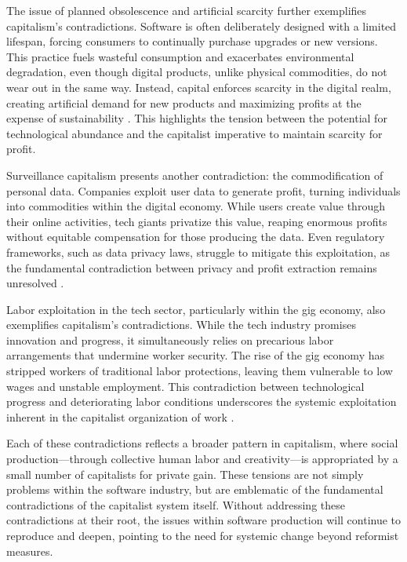 \begin{refsection}
The issue of planned obsolescence and artificial scarcity further exemplifies capitalism’s contradictions. Software is often deliberately designed with a limited lifespan, forcing consumers to continually purchase upgrades or new versions. This practice fuels wasteful consumption and exacerbates environmental degradation, even though digital products, unlike physical commodities, do not wear out in the same way. Instead, capital enforces scarcity in the digital realm, creating artificial demand for new products and maximizing profits at the expense of sustainability \cite[pp.~151-154]{foster2019}. This highlights the tension between the potential for technological abundance and the capitalist imperative to maintain scarcity for profit.

Surveillance capitalism presents another contradiction: the commodification of personal data. Companies exploit user data to generate profit, turning individuals into commodities within the digital economy. While users create value through their online activities, tech giants privatize this value, reaping enormous profits without equitable compensation for those producing the data. Even regulatory frameworks, such as data privacy laws, struggle to mitigate this exploitation, as the fundamental contradiction between privacy and profit extraction remains unresolved \cite[pp.~111-113]{zuboff2020}.

Labor exploitation in the tech sector, particularly within the gig economy, also exemplifies capitalism’s contradictions. While the tech industry promises innovation and progress, it simultaneously relies on precarious labor arrangements that undermine worker security. The rise of the gig economy has stripped workers of traditional labor protections, leaving them vulnerable to low wages and unstable employment. This contradiction between technological progress and deteriorating labor conditions underscores the systemic exploitation inherent in the capitalist organization of work \cite[pp.~145-148]{scholz2017}.

Each of these contradictions reflects a broader pattern in capitalism, where social production—through collective human labor and creativity—is appropriated by a small number of capitalists for private gain. These tensions are not simply problems within the software industry, but are emblematic of the fundamental contradictions of the capitalist system itself. Without addressing these contradictions at their root, the issues within software production will continue to reproduce and deepen, pointing to the need for systemic change beyond reformist measures.


\end{refsection}
